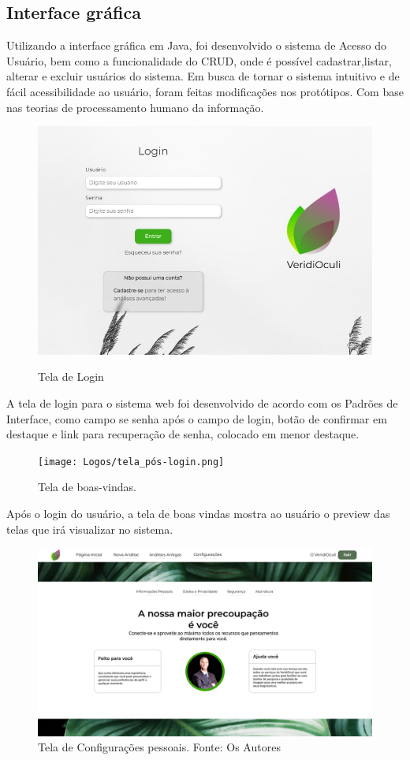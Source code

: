 \documentclass[
  a4paper,%
  12pt,%
  english,%
  brazilian,%
]{article}
\begin{document}
\subsection*{Interface gráfica}

Utilizando a interface gráfica em Java, foi desenvolvido o sistema de Acesso do Usuário, bem como a funcionalidade do CRUD, onde é possível cadastrar,listar, alterar e excluir usuários do sistema.
Em busca de tornar o sistema intuitivo e de fácil acessibilidade ao usuário, foram feitas modificações nos protótipos. Com base nas teorias de processamento humano da informação.

\begin{figure}[H]
    \centering
    \caption{Tela de Login}
    \includegraphics[width=.7\textwidth,keepaspectratio]{Logos/1.jpg}
    \label{fig:enter-label}
\end{figure}

A tela de login para o sistema web foi desenvolvido de acordo com os Padrões de Interface, como campo se senha após o campo de login, botão de confirmar em destaque e link para recuperação de senha, colocado em menor destaque.

\begin{figure}[H]
    \centering
    \caption{Tela de boas-vindas.}
    \texttt{[image: Logos/tela\_pós-login.png]}
    \label{fig:my_label}
\end{figure}


Após o login do usuário, a tela de boas vindas mostra ao usuário o preview das telas que irá visualizar no sistema. 

\begin{figure}[H]
    \centering
    \includegraphics[width=.7\textwidth,keepaspectratio]{Logos/tela_configurações2.png}
    \caption{Tela de Configurações pessoais. Fonte: Os Autores}
    \label{fig:my_label}
\end{figure}
\end{document}
